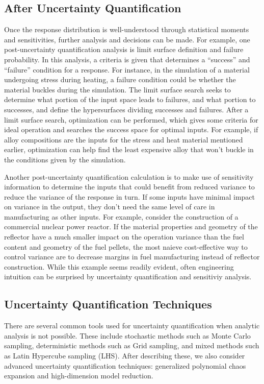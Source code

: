 \subsection{After Uncertainty Quantification}
Once the response distribution is well-understood through statistical moments and sensitivities, 
further analysis
and decisions can be made.  For example, one post-uncertainty quantification analysis is limit
surface definition and failure probability.  In this analysis, a criteria is given that determines
a ``success'' and ``failure'' condition for a response.  For instance, in the simulation of a
material undergoing stress during heating, a failure condition could be whether the material
buckles during the simulation.  The limit surface search seeks to determine what portion of the
input space leads to failures, and what portion to successes, and define the hypersurfaces dividing
successes and failures.  After a limit surface search, optimization can be performed, which gives
some criteria for ideal operation and searches the success space for optimal inputs.  For example,
if alloy compositions are the inputs for the stress and heat material mentioned earlier, optimization
can help find the least expensive alloy that won't buckle in the conditions given by the simulation.

Another post-uncertainty quantification calculation is to make use of sensitivity information to determine
the inputs that could benefit from reduced variance to reduce the variance of the response in turn.
If some inputs have minimal impact on variance in the output, they don't need the same level of care
in manufacturing as other inputs.  For example, consider the construction of a commercial nuclear power
reactor.  If the material properties and geometry of the reflector have a much smaller impact on the operation
variance than the fuel content and geometry of the fuel pellets, the most naieve cost-effective way to control
variance are to decrease margins in fuel manufacturing instead of reflector construction.  While this example
seems readily evident, often engineering intuition can be surprised by uncertainty quantification and
sensitiviy analysis.

\subsection{Uncertainty Quantification Techniques}
There are several common tools used for uncertainty quantification when analytic analysis is not possible.
These include stochastic methods such as Monte Carlo sampling, deterministic methods such as Grid sampling,
and mixed methods such as Latin Hypercube sampling (LHS).  After describing these, we also consider advanced
uncertainty quantification techniques: generalized polynomial chaos expansion and high-dimension
model reduction.

